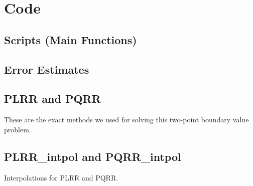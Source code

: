 \documentclass[a4paper,english]{article}
\begin{document}
	\clearpage
	

	\section{Code}\label{Code}
	
	\subsection{Scripts (Main Functions)}
	
	
	
	
	
	
	\subsection{Error Estimates}
	
	
	
	\subsection{PLRR and PQRR}
	These are the exact methods we used for solving this 
	two-point boundary value problem.
	
	
	
	
	
		
	
	
	\subsection{PLRR\_intpol and PQRR\_intpol}
	Interpolations for PLRR and PQRR.
	
\end{document}
